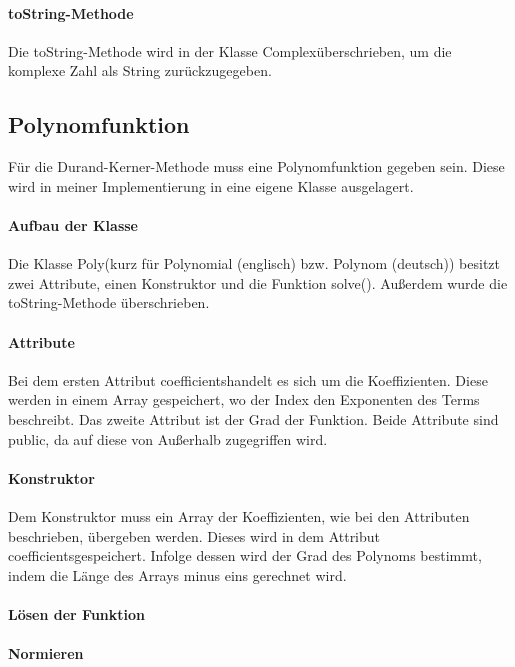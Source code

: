 \documentclass[12pt]{article}
\begin{document}
\paragraph{\glqq toString\grqq-Methode}
Die \glqq toString\grqq-Methode wird in der Klasse \glqq Complex\grqq\space überschrieben, um die komplexe Zahl als String zurückzugegeben.

\subsection{Polynomfunktion}
Für die Durand-Kerner-Methode muss eine Polynomfunktion gegeben sein. Diese wird in meiner Implementierung in eine eigene Klasse ausgelagert.

\paragraph{Aufbau der Klasse}
Die Klasse \glqq Poly\grqq\space (kurz für Polynomial (englisch) bzw. Polynom (deutsch)) besitzt zwei Attribute, einen Konstruktor und die Funktion \glqq solve()\grqq. Außerdem wurde die \glqq toString\grqq -Methode überschrieben.

\paragraph{Attribute}
Bei dem ersten Attribut \glqq coefficients\grqq\space handelt es sich um die Koeffizienten. Diese werden in einem Array gespeichert, wo der Index den Exponenten des Terms beschreibt. Das zweite Attribut ist der Grad der Funktion. Beide Attribute sind \glqq public\grqq, da auf diese von Außerhalb zugegriffen wird.

\paragraph{Konstruktor}
Dem Konstruktor muss ein Array der Koeffizienten, wie bei den Attributen beschrieben, übergeben werden. Dieses wird in dem Attribut \glqq coefficients\grqq\space gespeichert. Infolge dessen wird der Grad des Polynoms bestimmt, indem die Länge des Arrays minus eins gerechnet wird.

\paragraph{Lösen der Funktion}

\paragraph{Normieren}
\end{document}
